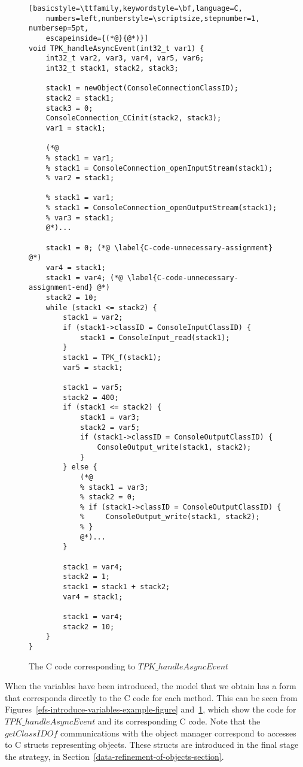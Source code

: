 \begin{figure}[tp!]
  \centering
  \setlength{\zedtab}{0.5cm}
  \setlength{\zedindent}{0pt}
  \setlength{\zedleftsep}{0pt}
  \setlength{\abovedisplayskip}{0pt}
  \setlength{\belowdisplayskip}{0pt}
  \setlength{\abovedisplayshortskip}{0pt}
  \setlength{\belowdisplayshortskip}{0pt}
  \begin{lstlisting}[basicstyle=\ttfamily,keywordstyle=\bf,language=C,
    numbers=left,numberstyle=\scriptsize,stepnumber=1, numbersep=5pt,
    escapeinside={(*@}{@*)}]
void TPK_handleAsyncEvent(int32_t var1) {
    int32_t var2, var3, var4, var5, var6;
    int32_t stack1, stack2, stack3;

    stack1 = newObject(ConsoleConnectionClassID);
    stack2 = stack1;
    stack3 = 0;
    ConsoleConnection_CCinit(stack2, stack3);
    var1 = stack1;
    
    (*@
    % stack1 = var1;
    % stack1 = ConsoleConnection_openInputStream(stack1);
    % var2 = stack1;
    
    % stack1 = var1;
    % stack1 = ConsoleConnection_openOutputStream(stack1);
    % var3 = stack1;
    @*)...

    stack1 = 0; (*@ \label{C-code-unnecessary-assignment} @*)
    var4 = stack1;
    stack1 = var4; (*@ \label{C-code-unnecessary-assignment-end} @*)
    stack2 = 10;
    while (stack1 <= stack2) {
        stack1 = var2;
        if (stack1->classID = ConsoleInputClassID) {
            stack1 = ConsoleInput_read(stack1);
        }
        stack1 = TPK_f(stack1);
        var5 = stack1;
        
        stack1 = var5;
        stack2 = 400;
        if (stack1 <= stack2) {  
            stack1 = var3;
            stack2 = var5;
            if (stack1->classID = ConsoleOutputClassID) {
                ConsoleOutput_write(stack1, stack2);
            }
        } else {
            (*@
            % stack1 = var3;
            % stack2 = 0;
            % if (stack1->classID = ConsoleOutputClassID) {
            %     ConsoleOutput_write(stack1, stack2);
            % }
            @*)...
        }
          
        stack1 = var4;
        stack2 = 1;
        stack1 = stack1 + stack2;
        var4 = stack1;

        stack1 = var4;
        stack2 = 10;
    }
}
\end{lstlisting}
  \caption{The C code corresponding to $TPK\_handleAsyncEvent$}
  \label{efs-introduce-variables-c-code-figure}
\end{figure}

When the variables have been introduced, the model that we obtain has
a form that corresponds directly to the C code for each method.
This can be seen from
Figures~\ref{efs-introduce-variables-example-figure}
and~\ref{efs-introduce-variables-c-code-figure}, which show the
\Circus{} code for $TPK\_handleAsyncEvent$ and its corresponding C
code.
Note that the $getClassIDOf$ communications with the object manager
correspond to accesses to C structs representing objects.
These structs are introduced in the final stage the strategy, in
Section~\ref{data-refinement-of-objects-section}.

